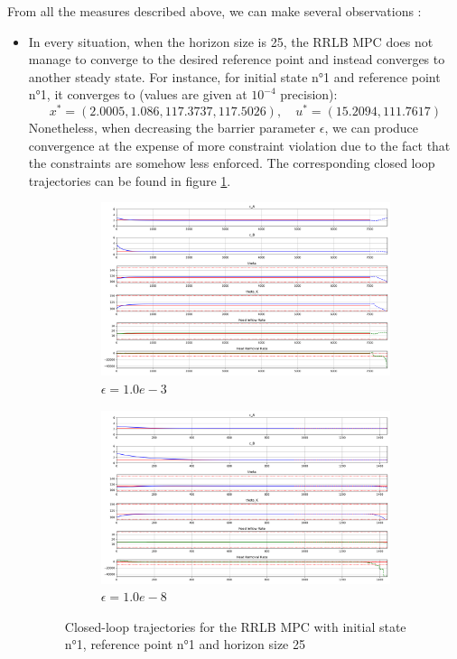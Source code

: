 \documentclass[12pt]{article}
\begin{document}
\noindent From all the measures described above, we can make several observations :

\begin{itemize}[label=\textbullet]
	\item In every situation, when the horizon size is 25, the RRLB MPC does not manage to converge to the desired reference point and instead converges to another steady state.
	For instance, for initial state n°1 and reference point n°1, it converges to (values are given at $10^{-4}$ precision):
	$$x^*=(2.0005, 1.086, 117.3737, 117.5026),\quad u^*=(15.2094, 111.7617)$$
	Nonetheless, when decreasing the barrier parameter $\epsilon$, we can produce convergence at the expense of more constraint violation due to the fact that the constraints are somehow less enforced.
	The corresponding closed loop trajectories can be found in figure \ref{fig:closedloop_traj_rrlb_1_1_25}.

	\begin{figure}[!hp]
		\centering
		\begin{subfigure}{15cm}
			\centering
			\includegraphics[width=15cm]{images/closedloop_traj_rrlb_1_1_25_not_converge.png}
			\caption{$\epsilon=1.0e-3$}
		\end{subfigure}
		\begin{subfigure}{15cm}
			\centering
			\includegraphics[width=15cm]{images/closedloop_traj_rrlb_1_1_25_converge.png}
			\caption{$\epsilon=1.0e-8$}
		\end{subfigure}
		\caption{Closed-loop trajectories for the RRLB MPC with initial state n°1, reference point n°1 and horizon size 25}
		\label{fig:closedloop_traj_rrlb_1_1_25}
	\end{figure}


\end{itemize}
\end{document}

